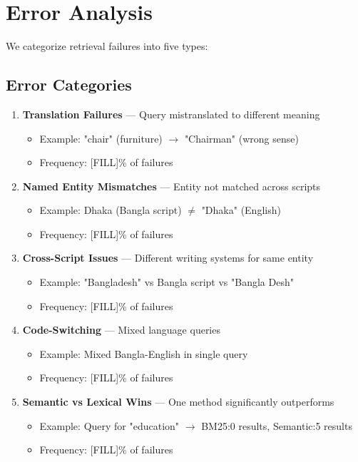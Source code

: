 \documentclass[12pt,a4paper]{report}
\begin{document}
\section{Error Analysis}

We categorize retrieval failures into five types:

\subsection{Error Categories}

\begin{enumerate}
    \item \textbf{Translation Failures} --- Query mistranslated to different meaning
        \begin{itemize}
            \item Example: "chair" (furniture) $\rightarrow$ "Chairman" (wrong sense)
            \item Frequency: [FILL]\% of failures
        \end{itemize}
    
    \item \textbf{Named Entity Mismatches} --- Entity not matched across scripts
        \begin{itemize}
            \item Example: Dhaka (Bangla script) $\neq$ "Dhaka" (English)
            \item Frequency: [FILL]\% of failures
        \end{itemize}
    
    \item \textbf{Cross-Script Issues} --- Different writing systems for same entity
        \begin{itemize}
            \item Example: "Bangladesh" vs Bangla script vs "Bangla Desh"
            \item Frequency: [FILL]\% of failures
        \end{itemize}
    
    \item \textbf{Code-Switching} --- Mixed language queries
        \begin{itemize}
            \item Example: Mixed Bangla-English in single query
            \item Frequency: [FILL]\% of failures
        \end{itemize}
    
    \item \textbf{Semantic vs Lexical Wins} --- One method significantly outperforms
        \begin{itemize}
            \item Example: Query for "education" $\rightarrow$ BM25:0 results, Semantic:5 results
            \item Frequency: [FILL]\% of failures
        \end{itemize}
\end{enumerate}
\end{document}
